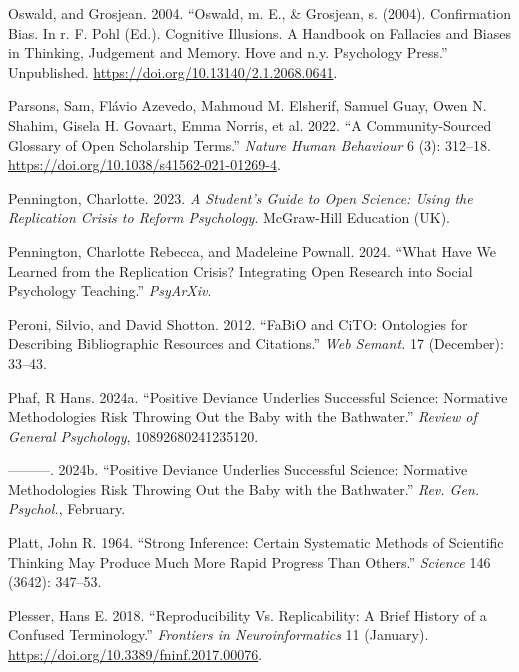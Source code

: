 \documentclass[
  letterpaper,
  DIV=11,
  numbers=noendperiod]{scrreprt}
\newlength{\cslhangindent}
\newenvironment{CSLReferences}[2] %
 {\begin{list}{}{%
  \setlength{\itemindent}{0pt}
  \setlength{\leftmargin}{0pt}
  \setlength{\parsep}{0pt}
  \ifodd #1
   \setlength{\leftmargin}{\cslhangindent}
   \setlength{\itemindent}{-1\cslhangindent}
  \fi
  \setlength{\itemsep}{#2\baselineskip}}}
 {\end{list}}
\begin{document}
\begin{CSLReferences}{1}{0}
Oswald, and Grosjean. 2004. {``Oswald, m. E., {\&} Grosjean, s. (2004).
Confirmation Bias. In r. F. Pohl (Ed.). Cognitive Illusions. A Handbook
on Fallacies and Biases in Thinking, Judgement and Memory. Hove and n.y.
Psychology Press.''} Unpublished.
\url{https://doi.org/10.13140/2.1.2068.0641}.

Parsons, Sam, Flávio Azevedo, Mahmoud M. Elsherif, Samuel Guay, Owen N.
Shahim, Gisela H. Govaart, Emma Norris, et al. 2022. {``A
Community-Sourced Glossary of Open Scholarship Terms.''} \emph{Nature
Human Behaviour} 6 (3): 312--18.
\url{https://doi.org/10.1038/s41562-021-01269-4}.

Pennington, Charlotte. 2023. \emph{A Student's Guide to Open Science:
Using the Replication Crisis to Reform Psychology}. McGraw-Hill
Education (UK).

Pennington, Charlotte Rebecca, and Madeleine Pownall. 2024. {``What Have
We Learned from the Replication Crisis? Integrating Open Research into
Social Psychology Teaching.''} \emph{PsyArXiv}.

Peroni, Silvio, and David Shotton. 2012. {``{FaBiO} and {CiTO}:
Ontologies for Describing Bibliographic Resources and Citations.''}
\emph{Web Semant.} 17 (December): 33--43.

Phaf, R Hans. 2024a. {``Positive Deviance Underlies Successful Science:
Normative Methodologies Risk Throwing Out the Baby with the
Bathwater.''} \emph{Review of General Psychology}, 10892680241235120.

---------. 2024b. {``Positive Deviance Underlies Successful Science:
Normative Methodologies Risk Throwing Out the Baby with the
Bathwater.''} \emph{Rev. Gen. Psychol.}, February.

Platt, John R. 1964. {``Strong Inference: Certain Systematic Methods of
Scientific Thinking May Produce Much More Rapid Progress Than Others.''}
\emph{Science} 146 (3642): 347--53.

Plesser, Hans E. 2018. {``Reproducibility Vs. Replicability: A Brief
History of a Confused Terminology.''} \emph{Frontiers in
Neuroinformatics} 11 (January).
\url{https://doi.org/10.3389/fninf.2017.00076}.


\end{CSLReferences}
\end{document}
